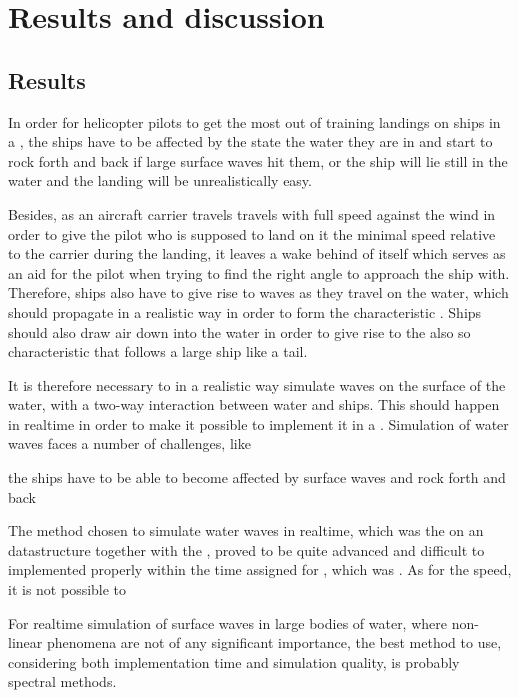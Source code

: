 \part{Results and discussion}

\chapter{Results}

In order for helicopter pilots to get the most out of training landings on ships in a , the ships have to be affected by the state the water they are in and start to rock forth and back if large surface waves hit them, or the ship will lie still in the water and the landing will be unrealistically easy.

Besides, as an aircraft carrier travels travels with full speed against the wind in order to give the pilot who is supposed to land on it the minimal speed relative to the carrier during the landing, it leaves a wake behind of itself which serves as an aid for the pilot when trying to find the right angle to approach the ship with. Therefore, ships also have to give rise to waves as they travel on the water, which should propagate in a realistic way in order to form the characteristic . Ships should also draw air down into the water in order to give rise to the also so characteristic \backwash that follows a large ship like a tail.

It is therefore necessary to in a realistic way simulate waves on the surface of the water, with a two-way interaction between water and ships. This should happen in realtime in order to make it possible to implement it in a . Simulation of water waves faces a number of challenges, like 

the ships have to be able to become affected by surface waves and rock forth and back 

The method chosen to simulate water waves in realtime, which was the \FVM on an \octree datastructure together with the \VOF, proved to be quite advanced and difficult to implemented properly within the time assigned for \thismasterthesiswork, which was \masterthesisworktime. As for the speed, it is not possible to 

For realtime simulation of surface waves in large bodies of water, where non-linear phenomena are not of any significant importance, the best method to use, considering both implementation time and simulation quality, is probably spectral methods.

